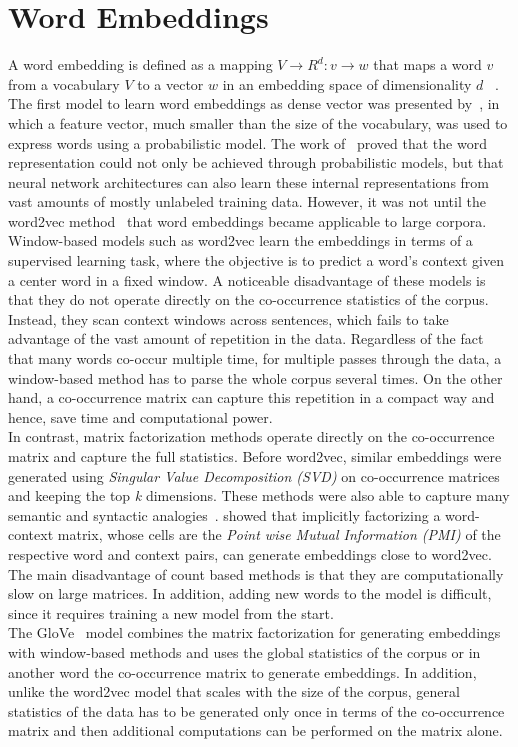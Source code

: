 \section{Word Embeddings}
\label{sec:wordembeddig}
A word embedding is defined as a mapping $ V\rightarrow { R }^{ d }:v \rightarrow w $ that maps a word $v$ from a vocabulary $V$ to a vector  $w$  in an embedding space of dimensionality $d$ ~. The first model to learn word embeddings as dense vector was presented by~, in which a feature vector, much smaller than the size of the vocabulary, was used to express words using a probabilistic model. The work of~ proved that the word representation could not only be achieved through probabilistic models, but that neural network architectures can also learn these internal representations from vast amounts of mostly unlabeled training data. However, it was not until the word2vec method~ that word embeddings became applicable to large corpora. 
Window-based models such as word2vec learn the embeddings in terms of a supervised learning task, where the objective is to predict a word's context given a center word in a fixed window. A noticeable disadvantage of these models is that they do not operate directly on the co-occurrence statistics of the corpus. Instead, they scan context windows across sentences, which fails to take advantage of the vast amount of repetition in the data. Regardless of the fact that many words co-occur multiple time, for multiple passes through the data, a window-based method has to parse the whole corpus several times. On the other hand, a co-occurrence matrix can capture this repetition in a compact way and hence, save time and computational power.  \\
In contrast, matrix factorization methods operate directly on the co-occurrence matrix and capture the full statistics. Before word2vec, similar embeddings were generated using \emph{Singular Value Decomposition (SVD)} on co-occurrence matrices and keeping the top \emph{k} dimensions. These methods were also able to capture many semantic and syntactic analogies~.  showed that implicitly factorizing a word-context matrix, whose cells are the \emph{Point wise Mutual Information (PMI)} of the respective word and context pairs, can generate embeddings close to word2vec.
The main disadvantage of count based methods is that they are computationally slow on large matrices. In addition, adding new words to the model is difficult, since it requires training a new model from the start.\\
The GloVe~ model combines the matrix factorization for generating embeddings with window-based methods and uses the global statistics of the corpus or in another word the co-occurrence matrix to generate embeddings. In addition, unlike the word2vec model that scales with the size of the corpus, general statistics of the data has to be generated only once in terms of the co-occurrence matrix and then additional computations can be performed on the matrix alone.
